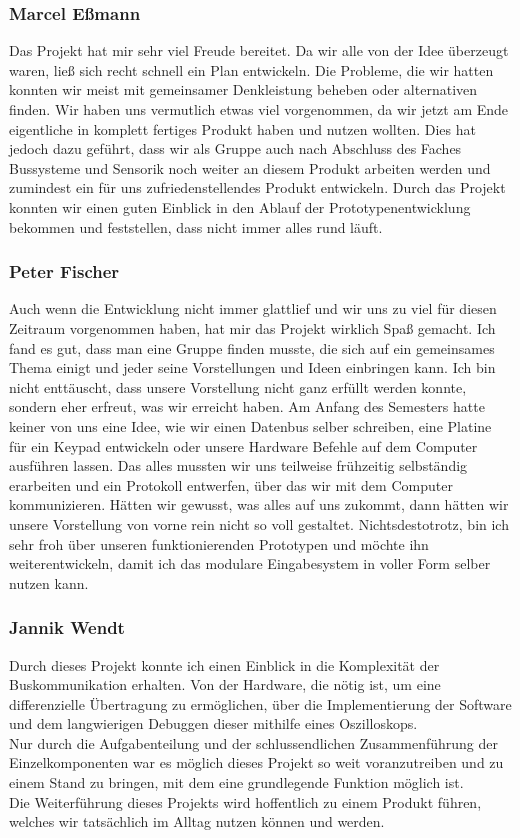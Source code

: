 \subsubsection{Marcel Eßmann}
Das Projekt hat mir sehr viel Freude bereitet. Da wir alle von der Idee überzeugt waren, ließ sich recht schnell ein Plan entwickeln. Die Probleme, die wir hatten konnten wir meist mit gemeinsamer Denkleistung beheben oder alternativen finden.
Wir haben uns vermutlich etwas viel vorgenommen, da wir jetzt am Ende eigentliche in komplett fertiges Produkt haben und nutzen wollten. Dies hat jedoch dazu geführt, dass wir als Gruppe auch nach Abschluss des Faches \glqq Bussysteme und Sensorik\grqq{} noch weiter an diesem Produkt arbeiten werden und zumindest ein für uns zufriedenstellendes Produkt entwickeln. 
Durch das Projekt konnten wir einen guten Einblick in den Ablauf der Prototypenentwicklung bekommen und feststellen, dass nicht immer alles rund läuft.

\subsubsection{Peter Fischer}
Auch wenn die Entwicklung nicht immer glattlief und wir uns zu viel für diesen Zeitraum vorgenommen haben, hat mir das Projekt wirklich Spaß gemacht. Ich fand es gut, dass man eine Gruppe finden musste, die sich auf ein gemeinsames Thema einigt und jeder seine Vorstellungen und Ideen einbringen kann. Ich bin nicht enttäuscht, dass unsere Vorstellung nicht ganz erfüllt werden konnte, sondern eher erfreut, was wir erreicht haben. Am Anfang des Semesters hatte keiner von uns eine Idee, wie wir einen Datenbus selber schreiben, eine Platine für ein Keypad entwickeln oder unsere Hardware Befehle auf dem Computer ausführen lassen. Das alles mussten wir uns teilweise frühzeitig selbständig erarbeiten und ein Protokoll entwerfen, über das wir mit dem Computer kommunizieren. Hätten wir gewusst, was alles auf uns zukommt, dann hätten wir unsere Vorstellung von vorne rein nicht so voll gestaltet. Nichtsdestotrotz, bin ich sehr froh über unseren funktionierenden Prototypen und möchte ihn weiterentwickeln, damit ich das \glqq modulare Eingabesystem\grqq{} in voller Form selber nutzen kann.

\subsubsection{Jannik Wendt}
Durch dieses Projekt konnte ich einen Einblick in die Komplexität der Buskommunikation erhalten. Von der Hardware, die nötig ist, um eine differenzielle Übertragung zu ermöglichen, über die Implementierung der Software und dem langwierigen Debuggen dieser mithilfe eines Oszilloskops. \\
Nur durch die Aufgabenteilung und der schlussendlichen Zusammenführung der Einzelkomponenten war es möglich dieses Projekt so weit voranzutreiben und zu einem Stand zu bringen, mit dem eine grundlegende Funktion möglich ist.\\ 
Die Weiterführung dieses Projekts wird hoffentlich zu einem Produkt führen, welches wir tatsächlich im Alltag nutzen können und werden.